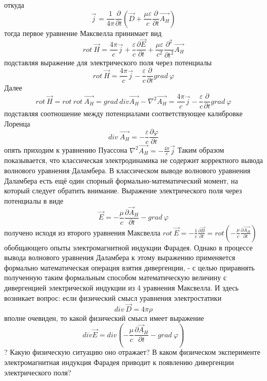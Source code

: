\documentclass[11pt]{article}
\makeatletter
\newcommand{\boxspacing}{\kern\kvtcb@left@rule\kern\kvtcb@boxsep}
\newcommand{\prompt}[4]{
        {\ttfamily\llap{{\color{#2}[#3]:\hspace{3pt}#4}}\vspace{-\baselineskip}}
    }
\makeatother
\begin{document}
откуда
\[{{\overrightarrow{j}}_{}}=\frac{1}{4\pi }\frac{\partial }{\partial t}\left( \overrightarrow{D}+\frac{\mu \varepsilon }{c}\frac{\partial }{\partial t}\overrightarrow{{{A}_{H}}} \right)\]
тогда первое уравнение Максвелла принимает вид
\[rot\ \overrightarrow{H}=\frac{4\pi }{c}\overrightarrow{j}+\frac{\varepsilon }{c}\frac{\partial \overrightarrow{E}}{\partial t}+\frac{\mu \varepsilon }{{{c}^{2}}}\frac{{{\partial }^{2}}}{\partial {{t}^{2}}}\overrightarrow{{{A}_{H}}}\]
подставляя выражение для электрического поля через потенциалы
\[rot\ \overrightarrow{H}=\frac{4\pi }{c}\overrightarrow{j}-\frac{\varepsilon }{c}\frac{\partial }{\partial t}grad\ \varphi \]
Далее
\[rot\ \overrightarrow{H}=rot\ rot\ \overrightarrow{{{A}_{H}}}=grad\ div\overrightarrow{{{A}_{H}}}-{{\nabla }^{2}}\overrightarrow{{{A}_{H}}}=\frac{4\pi }{c}\overrightarrow{j}-\frac{\varepsilon }{c}\frac{\partial }{\partial t}grad\ \varphi \]
подставляя соотношение между потенциалами соответствующее калибровке
Лоренца
\[div\ \overrightarrow{{{A}_{H}}}=-\frac{\varepsilon }{c}\frac{\partial \varphi }{\partial t}\]
опять приходим к уравнению Пуассона
\({{\nabla }^{2}}\overrightarrow{{{A}_{H}}}=-\frac{4\pi }{c}\overrightarrow{j}\)
Таким образом показывается, что классическая электродинамика не содержит
корректного вывода волнового уравнения Даламбера. В классическом выводе
волнового уравнения Даламбера есть ещё один спорный
формально-математический момент, на который следует обратить внимание.
Выражение электрического поля через потенциалы в виде
\[\overrightarrow{E}=-\frac{\mu }{c}\frac{\partial {{\overrightarrow{A}}_{H}}}{\partial t}-grad\ \varphi \]получено
исходя из второго уравнения Максвелла
\(rot\ \overrightarrow{E}=-\frac{1}{c}\frac{\partial \overrightarrow{B}}{\partial t}=rot\left( -\frac{\mu }{c}\frac{\partial \overrightarrow{{{A}_{H}}}}{\partial t} \right)\)
обобщающего опыты электромагнитной индукции Фарадея. Однако в процессе
вывода волнового уравнения Даламбера к этому выражению применяется
формально математическая операция взятия дивергенции, - с целью
приравнять полученную таким формальным способом математическую величину
с дивергенцией электрической индукции из 4 уравнения Максвелла. И здесь
возникает вопрос: если физический смысл уравнения электростатики
\[div\ \overrightarrow{D}=4\pi \rho \]вполне очевиден, то какой
физический смысл имеет выражение
\[div\overrightarrow{E}=div\left( -\frac{\mu }{c}\frac{\partial {{\overrightarrow{A}}_{H}}}{\partial t}-grad\ \varphi  \right)\]?
Какую физическую ситуацию оно отражает? В каком физическом эксперименте
электромагнитная индукция Фарадея приводит к появлению дивергенции
электрического поля?

    \begin{tcolorbox}[breakable, size=fbox, boxrule=1pt, pad at break*=1mm,colback=cellbackground, colframe=cellborder]
\prompt{In}{incolor}{ }{\boxspacing}
\begin{Verbatim}[commandchars=\\\{\}]

\end{Verbatim}
\end{tcolorbox}


    
    
    
\end{document}
